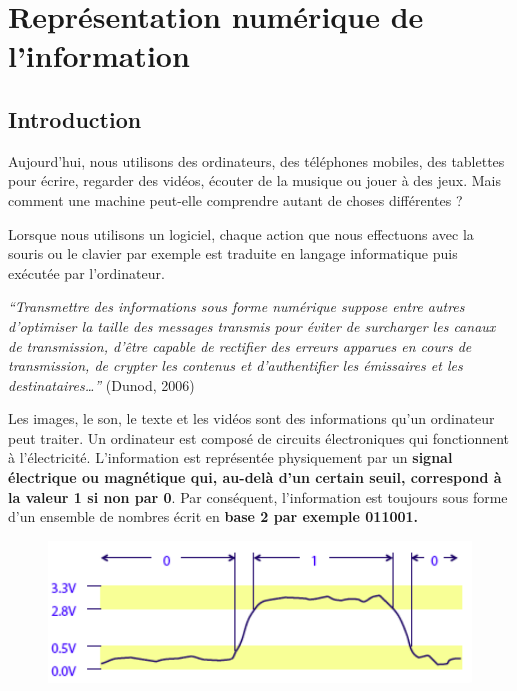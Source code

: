 \documentclass[11pt, a4paper]{book}
\begin{document}
\chapter{Représentation numérique de l’information}


\section{Introduction}

Aujourd’hui, nous utilisons des ordinateurs, des téléphones mobiles, des tablettes pour écrire, regarder des vidéos, écouter de la musique ou jouer à des jeux. Mais comment une machine peut-elle comprendre autant de choses différentes ?

Lorsque nous utilisons un logiciel, chaque action que nous effectuons avec la souris ou le clavier par exemple est traduite en langage informatique puis exécutée par l’ordinateur. 

{\it “Transmettre des informations sous forme numérique suppose entre autres d'optimiser la taille des messages transmis pour éviter de surcharger les canaux de transmission, d'être capable de rectifier des erreurs apparues en cours de transmission, de crypter les contenus et d'authentifier les émissaires et les destinataires…” }(Dunod, 2006)

Les images, le son, le texte et les vidéos sont des informations qu’un ordinateur peut traiter. Un ordinateur est composé de circuits électroniques qui fonctionnent à l'électricité. L’information est représentée physiquement par un\textbf{ signal électrique ou magnétique qui, au-delà d'un certain seuil, correspond à la valeur 1 si non par 0}. Par conséquent, l’information est toujours sous forme d’un ensemble de nombres écrit en \textbf{base 2 par exemple 011001.}

\begin{figure}[h]
\begin{center}
\includegraphics[scale=.5]{images/electric_binary}
\end{center}
\end{figure}
\end{document}
